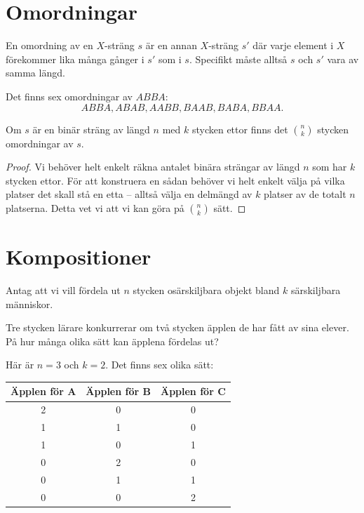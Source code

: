 \documentclass[nobib]{tufte-handout}
\begin{document}
\section{Omordningar}

\begin{definition}
  En omordning av en $X$-sträng $s$ är en annan $X$-sträng $s'$ där varje element i $X$ förekommer lika många gånger i $s'$ som i $s$. Specifikt måste alltså $s$ och $s'$ vara av samma längd.
\end{definition}

\begin{example}
  Det finns sex omordningar av $ABBA$:
  $$ABBA, ABAB, AABB, BAAB, BABA, BBAA.$$
\end{example}

\begin{proposition}\label{proposition_count_binary_rearrangements}
  Om $s$ är en binär sträng av längd $n$ med $k$ stycken ettor finns det $\binom{n}{k}$ stycken omordningar av $s$.
  \begin{proof}
    Vi behöver helt enkelt räkna antalet binära strängar av längd $n$ som har $k$ stycken ettor. För att konstruera en sådan behöver vi helt enkelt välja på vilka platser det skall stå en etta -- alltså välja en delmängd av $k$ platser av de totalt $n$ platserna. Detta vet vi att vi kan göra på $\binom{n}{k}$ sätt.
  \end{proof}
\end{proposition}

\section{Kompositioner}

Antag att vi vill fördela ut $n$ stycken osärskiljbara objekt bland $k$ särskiljbara människor.

\begin{example}
  Tre stycken lärare konkurrerar om två stycken äpplen de har fått av sina elever. På hur många olika sätt kan äpplena fördelas ut?

  Här är $n=3$ och $k=2$. Det finns sex olika sätt:
  \begin{table}[h]
    \begin{tabularx}{0.7\textwidth}{ccc}
    Äpplen för A & Äpplen för B      & Äpplen för C \\ 
    \midrule
    2 & 0 & 0\\
    1 & 1 & 0\\
    1 & 0 & 1\\
    0 & 2 & 0\\
    0 & 1 & 1\\
    0 & 0 & 2
    \end{tabularx}
    \end{table}
\end{example}
\end{document}
